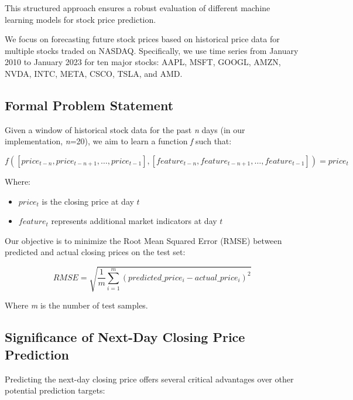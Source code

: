 \documentclass[sigconf]{acmart}
\begin{document}
This structured approach ensures a robust evaluation of different machine learning models for stock price prediction.

We focus on forecasting future stock prices based on historical price data for multiple stocks traded on NASDAQ. Specifically, we use time series from January 2010 to January 2023 for ten major stocks: AAPL, MSFT, GOOGL, AMZN, NVDA, INTC, META, CSCO, TSLA, and AMD.

\subsection{Formal Problem Statement}

Given a window of historical stock data for the past \textit{n} days (in our implementation, \textit{n}=20), we aim to learn a function \textit{f} such that:

\begin{equation}
f([price_{t-n}, price_{t-n+1}, \ldots, price_{t-1}], [feature_{t-n}, feature_{t-n+1}, \ldots, feature_{t-1}]) = price_t
\end{equation}

Where:
\begin{itemize}
\item $price_t$ is the closing price at day $t$
\item $feature_t$ represents additional market indicators at day $t$
\end{itemize}

Our objective is to minimize the Root Mean Squared Error (RMSE) between predicted and actual closing prices on the test set:

\begin{equation}
RMSE = \sqrt{\frac{1}{m} \sum_{i=1}^{m} (predicted\_price_i - actual\_price_i)^2}
\end{equation}

Where \textit{m} is the number of test samples.

\subsection{Significance of Next-Day Closing Price Prediction}

Predicting the next-day closing price offers several critical advantages over other potential prediction targets:
\end{document}
